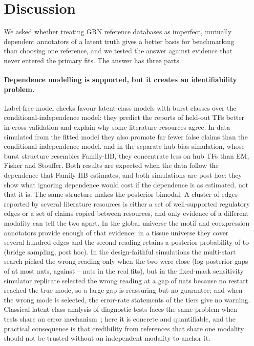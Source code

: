 \section{Discussion}\label{sec:discussion}

We asked whether treating GRN reference databases as imperfect, mutually dependent annotators of a latent truth gives a better basis for benchmarking than choosing one reference, and we tested the answer against evidence that never entered the primary fits.
The answer has three parts.

\paragraph{Dependence modelling is supported, but it creates an identifiability problem.}
Label-free model checks favour latent-class models with burst classes over the conditional-independence model: they predict the reports of held-out TFs better in cross-validation and explain why some literature resources agree. In data simulated from the fitted model they also promote far fewer false claims than the conditional-independence model, and in the separate hub-bias simulation, whose burst structure resembles Family-HB, they concentrate less on hub TFs than EM, Fisher and Stouffer. Both results are expected when the data follow the dependence that Family-HB estimates, and both simulations are post hoc; they show what ignoring dependence would cost if the dependence is as estimated, not that it is.
The same structure makes the posterior bimodal.
A cluster of edges reported by several literature resources is either a set of well-supported regulatory edges or a set of claims copied between resources, and only evidence of a different modality can tell the two apart.
In the global universe the motif and coexpression annotators provide enough of that evidence; in a tissue universe they cover several hundred edges and the second reading retains a posterior probability of \nBridgePTisLgMin{} to \nBridgePTisLgMax{} (bridge sampling, post hoc).
In the design-faithful simulations the multi-start search picked the wrong reading only when the two were close (log-posterior gaps of at most \nSimWrongGapMax{} nats, against \nHbGapTisMin{}--\nHbGapGlob{} nats in the real fits), but in the fixed-mask sensitivity simulator \nSimFixedWrongN{} replicate selected the wrong reading at a gap of \nSimFixedWrongGapMax{} nats because no restart reached the true mode, so a large gap is reassuring but no guarantee; and when the wrong mode is selected, the error-rate statements of the tiers give no warning.
Classical latent-class analysis of diagnostic tests faces the same problem when tests share an error mechanism~\citep{albert2004cautionary}; here it is concrete and quantifiable, and the practical consequence is that credibility from references that share one modality should not be trusted without an independent modality to anchor it.

